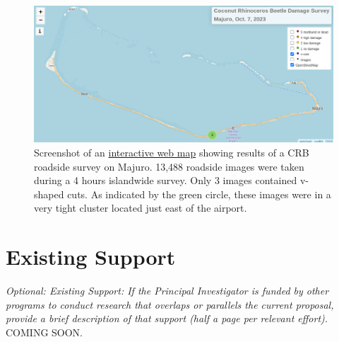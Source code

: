 \documentclass[11pt,english,letterpaper]{scrartcl}
\begin{document}
\begin{figure}[H]
	\centering
	\includegraphics[width=\linewidth]{images/majuro-webmap}
	\caption{Screenshot of an \href{https://aubreymoore.github.io/Majuro-CRB-damage-map-1/webmap}{interactive web map} showing results of a CRB roadside survey on Majuro. 13,488 roadside images were taken during a 4 hours islandwide survey. Only 3 images contained v-shaped cuts. As indicated by the green circle, these images were in a very tight cluster located just east of the airport.}
	\label{fig:majuro-webmap}
\end{figure}

\clearpage
\section{Existing Support}

\textit{Optional: Existing Support: If the Principal Investigator is funded by other programs to conduct research that overlaps or parallels the current proposal, provide a brief description of that support (half a page per relevant effort).} \\

COMING SOON.
\end{document}

